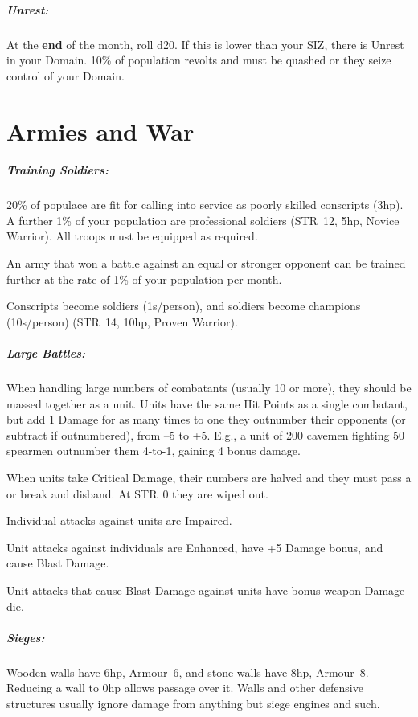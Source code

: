 \documentclass[itdr]{subfiles}
\begin{document}
\subparagraph{Unrest:} At the \textbf{end} of the month, roll d20. If this is lower than your SIZ, there is Unrest in your Domain. 10\% of population revolts and must be quashed or they seize control of your Domain.

\section{Armies and War}


\subparagraph{Training Soldiers:} 20\% of populace are fit for calling into service as poorly skilled conscripts (3hp). A further 1\% of your population are professional soldiers (STR~12, 5hp, Novice Warrior). All troops must be equipped as required.

An army that won a battle against an equal or stronger opponent can be trained further at the rate of 1\% of your population per month.

Conscripts become soldiers (1s/person), and \mbox{soldiers} become champions (10s/person) (STR~14, 10hp, Proven Warrior).

\subparagraph{Large Battles:} When handling large numbers of combatants (usually 10 or more), they should be massed together as a unit. Units have the same Hit Points as a single combatant, but add 1 Damage for as many times to one they outnumber their opponents (or subtract if outnumbered), from --5 to +5. E.g., a unit of 200 cavemen fighting 50 spearmen outnumber them \mbox{4-to-1}, gaining 4 bonus damage.

When units take Critical Damage, their numbers are halved and they must pass a  or break and disband. At STR~0 they are wiped out.

Individual attacks against units are Impaired.

Unit attacks against individuals are Enhanced, have +5 Damage bonus, and cause Blast Damage.

Unit attacks that cause Blast Damage against units have bonus weapon Damage die.

\subparagraph{Sieges:} Wooden walls have 6hp, Armour~6, and stone walls have 8hp, Armour~8. Reducing a wall to 0hp allows passage over it. Walls and other defensive structures usually ignore damage from anything but siege engines and such.
\end{document}
